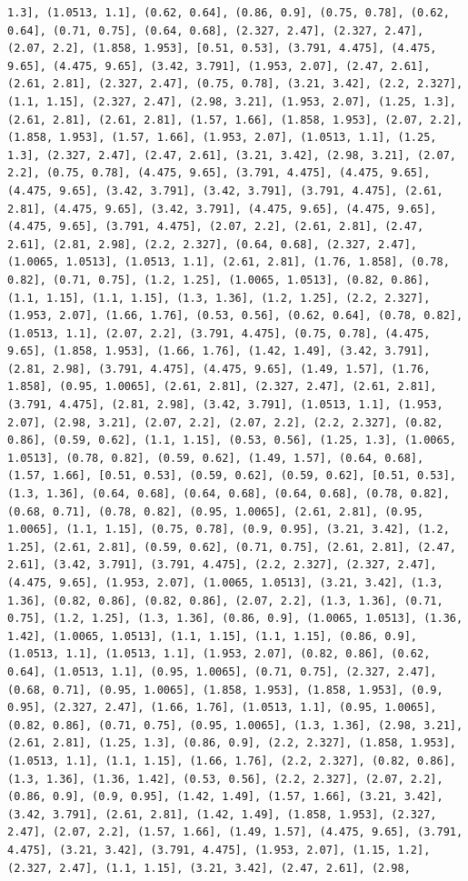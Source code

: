 \documentclass[12pt,fleqn]{article}\usepackage{../common}
\begin{document}
\begin{verbatim}
1.3], (1.0513, 1.1], (0.62, 0.64], (0.86, 0.9], (0.75, 0.78], (0.62, 0.64], (0.71, 0.75], (0.64, 0.68], (2.327, 2.47], (2.327, 2.47], (2.07, 2.2], (1.858, 1.953], [0.51, 0.53], (3.791, 4.475], (4.475, 9.65], (4.475, 9.65], (3.42, 3.791], (1.953, 2.07], (2.47, 2.61], (2.61, 2.81], (2.327, 2.47], (0.75, 0.78], (3.21, 3.42], (2.2, 2.327], (1.1, 1.15], (2.327, 2.47], (2.98, 3.21], (1.953, 2.07], (1.25, 1.3], (2.61, 2.81], (2.61, 2.81], (1.57, 1.66], (1.858, 1.953], (2.07, 2.2], (1.858, 1.953], (1.57, 1.66], (1.953, 2.07], (1.0513, 1.1], (1.25, 1.3], (2.327, 2.47], (2.47, 2.61], (3.21, 3.42], (2.98, 3.21], (2.07, 2.2], (0.75, 0.78], (4.475, 9.65], (3.791, 4.475], (4.475, 9.65], (4.475, 9.65], (3.42, 3.791], (3.42, 3.791], (3.791, 4.475], (2.61, 2.81], (4.475, 9.65], (3.42, 3.791], (4.475, 9.65], (4.475, 9.65], (4.475, 9.65], (3.791, 4.475], (2.07, 2.2], (2.61, 2.81], (2.47, 2.61], (2.81, 2.98], (2.2, 2.327], (0.64, 0.68], (2.327, 2.47], (1.0065, 1.0513], (1.0513, 1.1], (2.61, 2.81], (1.76, 1.858], (0.78, 0.82], (0.71, 0.75], (1.2, 1.25], (1.0065, 1.0513], (0.82, 0.86], (1.1, 1.15], (1.1, 1.15], (1.3, 1.36], (1.2, 1.25], (2.2, 2.327], (1.953, 2.07], (1.66, 1.76], (0.53, 0.56], (0.62, 0.64], (0.78, 0.82], (1.0513, 1.1], (2.07, 2.2], (3.791, 4.475], (0.75, 0.78], (4.475, 9.65], (1.858, 1.953], (1.66, 1.76], (1.42, 1.49], (3.42, 3.791], (2.81, 2.98], (3.791, 4.475], (4.475, 9.65], (1.49, 1.57], (1.76, 1.858], (0.95, 1.0065], (2.61, 2.81], (2.327, 2.47], (2.61, 2.81], (3.791, 4.475], (2.81, 2.98], (3.42, 3.791], (1.0513, 1.1], (1.953, 2.07], (2.98, 3.21], (2.07, 2.2], (2.07, 2.2], (2.2, 2.327], (0.82, 0.86], (0.59, 0.62], (1.1, 1.15], (0.53, 0.56], (1.25, 1.3], (1.0065, 1.0513], (0.78, 0.82], (0.59, 0.62], (1.49, 1.57], (0.64, 0.68], (1.57, 1.66], [0.51, 0.53], (0.59, 0.62], (0.59, 0.62], [0.51, 0.53], (1.3, 1.36], (0.64, 0.68], (0.64, 0.68], (0.64, 0.68], (0.78, 0.82], (0.68, 0.71], (0.78, 0.82], (0.95, 1.0065], (2.61, 2.81], (0.95, 1.0065], (1.1, 1.15], (0.75, 0.78], (0.9, 0.95], (3.21, 3.42], (1.2, 1.25], (2.61, 2.81], (0.59, 0.62], (0.71, 0.75], (2.61, 2.81], (2.47, 2.61], (3.42, 3.791], (3.791, 4.475], (2.2, 2.327], (2.327, 2.47], (4.475, 9.65], (1.953, 2.07], (1.0065, 1.0513], (3.21, 3.42], (1.3, 1.36], (0.82, 0.86], (0.82, 0.86], (2.07, 2.2], (1.3, 1.36], (0.71, 0.75], (1.2, 1.25], (1.3, 1.36], (0.86, 0.9], (1.0065, 1.0513], (1.36, 1.42], (1.0065, 1.0513], (1.1, 1.15], (1.1, 1.15], (0.86, 0.9], (1.0513, 1.1], (1.0513, 1.1], (1.953, 2.07], (0.82, 0.86], (0.62, 0.64], (1.0513, 1.1], (0.95, 1.0065], (0.71, 0.75], (2.327, 2.47], (0.68, 0.71], (0.95, 1.0065], (1.858, 1.953], (1.858, 1.953], (0.9, 0.95], (2.327, 2.47], (1.66, 1.76], (1.0513, 1.1], (0.95, 1.0065], (0.82, 0.86], (0.71, 0.75], (0.95, 1.0065], (1.3, 1.36], (2.98, 3.21], (2.61, 2.81], (1.25, 1.3], (0.86, 0.9], (2.2, 2.327], (1.858, 1.953], (1.0513, 1.1], (1.1, 1.15], (1.66, 1.76], (2.2, 2.327], (0.82, 0.86], (1.3, 1.36], (1.36, 1.42], (0.53, 0.56], (2.2, 2.327], (2.07, 2.2], (0.86, 0.9], (0.9, 0.95], (1.42, 1.49], (1.57, 1.66], (3.21, 3.42], (3.42, 3.791], (2.61, 2.81], (1.42, 1.49], (1.858, 1.953], (2.327, 2.47], (2.07, 2.2], (1.57, 1.66], (1.49, 1.57], (4.475, 9.65], (3.791, 4.475], (3.21, 3.42], (3.791, 4.475], (1.953, 2.07], (1.15, 1.2], (2.327, 2.47], (1.1, 1.15], (3.21, 3.42], (2.47, 2.61], (2.98, 
\end{verbatim}
\end{document}
